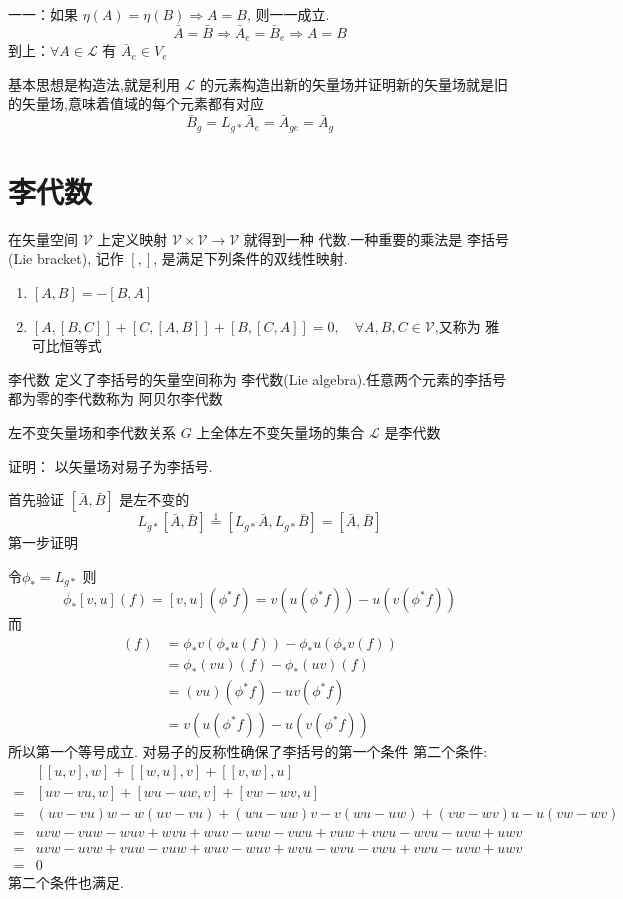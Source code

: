 \documentclass[../main.tex]{subfiles}
\begin{document}
 一一：如果 $\eta(A) = \eta(B) \Rightarrow A=B$, 则一一成立.
     $$ \bar{A} = \bar{B}\Rightarrow \bar{A}_e = \bar{B}_e \Rightarrow A = B $$
 到上：$\forall A \in \mathscr{L}$ 有 $\bar{A}_e \in V_e$

 基本思想是构造法,就是利用 $\mathscr{L}$ 的元素构造出新的矢量场并证明新的矢量场就是旧的矢量场,意味着值域的每个元素都有对应
     $$ \bar{B}_g = L_{g*}\bar{A}_e = \bar{A}_{ge} = \bar{A}_g $$
 \chapter{李代数}
 在矢量空间 $\mathscr{V}$ 上定义映射 $\mathscr{V}\times \mathscr{V}\rightarrow \mathscr{V}$ 就得到一种 代数.一种重要的乘法是 李括号(Lie bracket), 记作 $[,]$, 是满足下列条件的双线性映射.
 \begin{enumerate}
     \item $[A,B]= -[B,A]$
     \item $[A,[B,C]] + [C,[A,B]]+[B,[C,A]] =0,\quad \forall A,B,C\in\mathscr{V}$,又称为 雅可比恒等式
 \end{enumerate}
 \begin{definition}{}{李代数}
     定义了李括号的矢量空间称为 李代数(Lie algebra).任意两个元素的李括号都为零的李代数称为 阿贝尔李代数
 \end{definition}
 \begin{theorem}{}{左不变矢量场和李代数关系}
      $G$ 上全体左不变矢量场的集合 $\mathscr{L}$ 是李代数
 \end{theorem}
 证明： 以矢量场对易子为李括号.

 首先验证 $[\bar{A},\bar{B}]$ 是左不变的
     $$ L_{g*}[\bar{A},\bar{B}] \stackrel{1}{=} [L_{g*}\bar{A}, L_{g*}\bar{B}] = [\bar{A},\bar{B}]$$
     第一步证明

     令$\phi_* = L_{g*}$ 
     则$$\phi_*[v,u](f) = [v,u](\phi^*f) = v(u(\phi^*f)) - u(v(\phi^*f))$$
     而\begin{align*}
         [\phi_*v,\phi_*u](f) &= \phi_*v(\phi_*u(f)) - \phi_*u(\phi_*v(f))\\
         &= \phi_*(vu)(f) - \phi_*(uv)(f) \\
         &=(vu)(\phi^*f) - uv(\phi^*f) \\
         &=v(u(\phi^*f)) - u(v(\phi^*f))
     \end{align*}
     所以第一个等号成立.
     对易子的反称性确保了李括号的第一个条件
     第二个条件:
     \begin{align*}
         &[[u,v],w] + [[w,u],v]+[[v,w],u]\\
        =&[uv-vu,w] + [wu-uw,v]+[vw-wv,u]\\
        =&(uv-vu)w-w(uv-vu) + (wu-uw)v-v(wu-uw)+(vw-wv)u-u(vw-wv)\\
        =&uvw-vuw-wuv+wvu +wuv - uvw -vwu+vuw + vwu-wvu -uvw+uwv\\ 
        =&uvw-uvw+vuw-vuw+wuv-wuv+wvu-wvu-vwu+vwu-uvw+uwv\\ 
        =&0
     \end{align*}
     第二个条件也满足.
\end{document}
